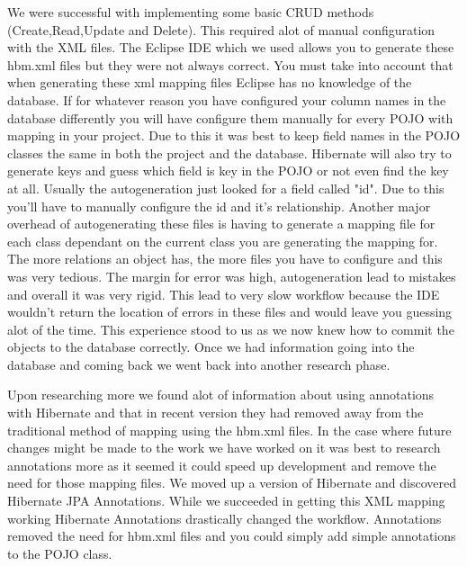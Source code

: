 We were successful with implementing some basic CRUD methods (Create,Read,Update and Delete). This required alot of manual configuration with the XML files. The Eclipse IDE which we used allows you to generate these hbm.xml files but they were not always correct. You must take into account that when generating these xml mapping files Eclipse has no knowledge of the database. If for whatever reason you have configured your column names in the database differently you will have configure them manually for every POJO with mapping in your project. Due to this it was best to keep field names in the POJO classes the same in both the project and the database. Hibernate will also try to generate keys and guess which field is key in the POJO or not even find the key at all. Usually the autogeneration just looked for a field called "id". Due to this you'll have to manually configure the id and it's relationship. Another major overhead of autogenerating these files is having to generate a mapping file for each class dependant on the current class you are generating the mapping for. The more relations an object has, the more files you have to configure and this was very tedious. The margin for error was high, autogeneration lead to mistakes and overall it was very rigid. This lead to very slow workflow because the IDE wouldn't return the location of errors in these files and would leave you guessing alot of the time. This experience stood to us as we now knew how to commit the objects to the database correctly. Once we had information going into the database and coming back we went back into another research phase.

Upon researching more we found alot of information about using annotations with Hibernate and that in recent version they had removed away from the traditional method of mapping using the hbm.xml files. In the case where future changes might be made to the work we have worked on it was best to research annotations more as it seemed it could speed up development and remove the need for those mapping files. We moved up a version of Hibernate and discovered Hibernate JPA Annotations. While we succeeded in getting this XML mapping working Hibernate Annotations drastically changed the workflow. Annotations removed the need for hbm.xml files and you could simply add simple annotations to the POJO class.

